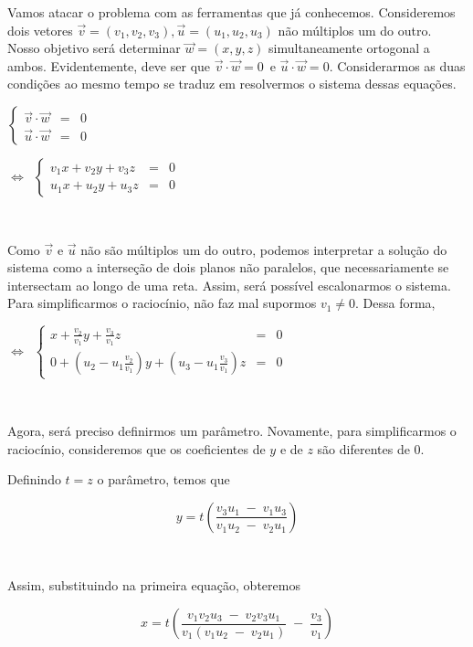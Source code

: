 Vamos atacar o problema com as ferramentas que já conhecemos. Consideremos dois vetores \(\vec{v} = (v_1, v_2, v_3), \vec{u} = (u_1, u_2, u_3)\) não múltiplos um do outro. Nosso objetivo será determinar \(\vec{w} = (x, y, z)\) simultaneamente ortogonal a ambos. Evidentemente, deve ser que \(\vec{v} \cdot \vec{w} = 0\) e \(\vec{u} \cdot \vec{w} = 0\). Considerarmos as duas condições ao mesmo tempo se traduz em resolvermos o sistema dessas equações.

\(
\left \{ \begin{array}{rcl} \vec{v} \cdot \vec{w} &=& 0 \\ \vec{u} \cdot \vec{w} &=& 0  \end{array} \right.
\)

\(\Longleftrightarrow\) \(
\left \{ \begin{array}{rcl} v_1x + v_2y + v_3z &=& 0 \\ u_1x + u_2y + u_3z &=& 0  \end{array} \right.
\)

 

Como \(\vec{v}\) e \(\vec{u}\) não são múltiplos um do outro, podemos interpretar a solução do sistema como a interseção de dois planos não paralelos, que necessariamente se intersectam ao longo de uma reta. Assim, será possível escalonarmos o sistema. Para simplificarmos o raciocínio, não faz mal supormos \(v_1 \neq 0\). Dessa forma,

\(\Longleftrightarrow\) \(
\left \{ \begin{array}{rcl} x + \frac{v_2}{v_1}y + \frac{v_3}{v_1}z &=& 0 \\ 0 + \left(u_2 - u_1\frac{v_2}{v_1}\right)y + \left(u_3 - u_1\frac{v_3}{v_1}\right)z &=& 0  \end{array} \right.
\)

 

Agora, será preciso definirmos um parâmetro. Novamente, para simplificarmos o raciocínio, consideremos que os coeficientes de \(y\) e de \(z\) são diferentes de \(0\).

Definindo \(t = z\) o parâmetro, temos que

\[
y = t \left( \frac{v_3u_1 \; - \; v_1u_3}{v_1u_2 \; - \; v_2u_1} \right)
\]

 

Assim, substituindo na primeira equação, obteremos

\[
x = t \left( \frac{v_1v_2u_3 \; - \; v_2v_3u_1}{v_1(v_1u_2 \; - \; v_2u_1)} \; - \; \frac{v_3}{v_1} \right)
\]


